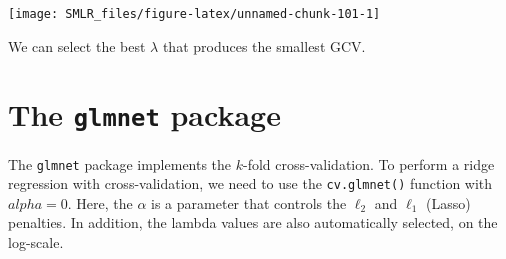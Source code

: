 \documentclass[
]{book}
\newenvironment{Shaded}{\begin{snugshade}}{\end{snugshade}}
\newcommand{\AttributeTok}[1]{\textcolor[rgb]{0.13,0.29,0.53}{#1}}
\newcommand{\DecValTok}[1]{\textcolor[rgb]{0.00,0.00,0.81}{#1}}
\newcommand{\DocumentationTok}[1]{\textcolor[rgb]{0.56,0.35,0.01}{\textbf{\textit{#1}}}}
\newcommand{\FunctionTok}[1]{\textcolor[rgb]{0.13,0.29,0.53}{\textbf{#1}}}
\newcommand{\NormalTok}[1]{#1}
\newcommand{\OtherTok}[1]{\textcolor[rgb]{0.56,0.35,0.01}{#1}}
\newcommand{\SpecialCharTok}[1]{\textcolor[rgb]{0.81,0.36,0.00}{\textbf{#1}}}
\newcommand{\StringTok}[1]{\textcolor[rgb]{0.31,0.60,0.02}{#1}}
\theoremstyle{definition}
\theoremstyle{definition}
\theoremstyle{definition}
\theoremstyle{definition}
\theoremstyle{remark}
\begin{document}
\begin{center}\texttt{[image: SMLR\_files/figure-latex/unnamed-chunk-101-1]} \end{center}

We can select the best \(\lambda\) that produces the smallest GCV.

\begin{Shaded}
\end{Shaded}

\hypertarget{the-glmnet-package}{%
\section{\texorpdfstring{The \texttt{glmnet} package}{The glmnet package}}\label{the-glmnet-package}}

The \texttt{glmnet} package implements the \(k\)-fold cross-validation. To perform a ridge regression with cross-validation, we need to use the \texttt{cv.glmnet()} function with \(alpha = 0\). Here, the \(\alpha\) is a parameter that controls the \(\ell_2\) and \(\ell_1\) (Lasso) penalties. In addition, the lambda values are also automatically selected, on the log-scale.

\begin{Shaded}
\end{Shaded}
\end{document}
